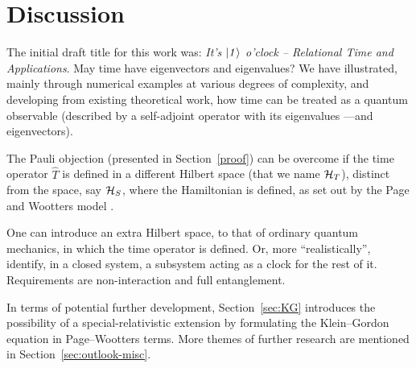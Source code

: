 \section{Discussion}

The initial draft title for this work was: 
\textit{It's $\it\ket{1}$ o'clock -- Relational Time and Applications}.
May time have eigenvectors and eigenvalues?
We have illustrated,
mainly through numerical examples
at various degrees of complexity,
and developing from existing theoretical work,
how time can be treated as a quantum observable
(described by a self-adjoint operator with its eigenvalues ---and eigenvectors).

The Pauli objection (presented in Section~\ref{proof})
can be overcome if the time operator $\hat{T}$
is defined in a different Hilbert space (that we name $\mathcal{H}_T$),
distinct from
the space, say $\mathcal{H}_S$, where the Hamiltonian is defined,
as set out by the Page and Wootters model
\parencite{PageWootters, Lloyd:Time, Marletto:Evolution, Maccone:QMOT, Maccone:Pauli}.

One can introduce an extra Hilbert space, to that of ordinary quantum mechanics,
in which the time operator is defined.
Or, more ``realistically'', identify, in a closed system, a subsystem
acting as a clock for the rest of it. Requirements are non-interaction and
full entanglement.

In terms of potential further development,
Section~\ref{sec:KG} introduces the possibility of a special-relativistic extension
by formulating the Klein--Gordon equation in Page--Wootters terms.
More themes of further research are mentioned in Section~\ref{sec:outlook-misc}.



